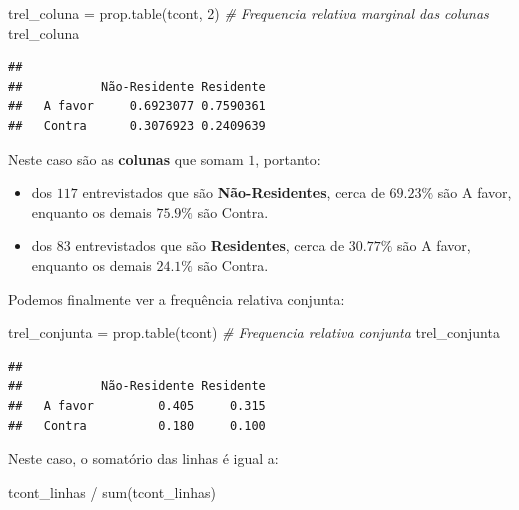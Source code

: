\documentclass[
]{book}
\newenvironment{Shaded}{\begin{snugshade}}{\end{snugshade}}
\newcommand{\CommentTok}[1]{\textcolor[rgb]{0.56,0.35,0.01}{\textit{#1}}}
\newcommand{\DecValTok}[1]{\textcolor[rgb]{0.00,0.00,0.81}{#1}}
\newcommand{\FunctionTok}[1]{\textcolor[rgb]{0.00,0.00,0.00}{#1}}
\newcommand{\NormalTok}[1]{#1}
\newcommand{\OtherTok}[1]{\textcolor[rgb]{0.56,0.35,0.01}{#1}}
\newcommand{\SpecialCharTok}[1]{\textcolor[rgb]{0.00,0.00,0.00}{#1}}
\begin{document}
\begin{Shaded}
\begin{Highlighting}[]
\NormalTok{trel\_coluna }\OtherTok{=} \FunctionTok{prop.table}\NormalTok{(tcont, }\DecValTok{2}\NormalTok{) }\CommentTok{\# Frequencia relativa marginal das colunas}
\NormalTok{trel\_coluna}
\end{Highlighting}
\end{Shaded}

\begin{verbatim}
##          
##           Não-Residente Residente
##   A favor     0.6923077 0.7590361
##   Contra      0.3076923 0.2409639
\end{verbatim}

Neste caso são as \textbf{colunas} que somam \(1\), portanto:

\begin{itemize}
\item
  dos \(117\) entrevistados que são \textbf{Não-Residentes}, cerca de \(69.23\%\) são A favor, enquanto os demais \(75.9\%\) são Contra.
\item
  dos \(83\) entrevistados que são \textbf{Residentes}, cerca de \(30.77\%\) são A favor, enquanto os demais \(24.1\%\) são Contra.
\end{itemize}

Podemos finalmente ver a frequência relativa conjunta:

\begin{Shaded}
\begin{Highlighting}[]
\NormalTok{trel\_conjunta }\OtherTok{=} \FunctionTok{prop.table}\NormalTok{(tcont) }\CommentTok{\# Frequencia relativa conjunta}
\NormalTok{trel\_conjunta}
\end{Highlighting}
\end{Shaded}

\begin{verbatim}
##          
##           Não-Residente Residente
##   A favor         0.405     0.315
##   Contra          0.180     0.100
\end{verbatim}

Neste caso, o somatório das linhas é igual a:

\begin{Shaded}
\begin{Highlighting}[]
\NormalTok{tcont\_linhas }\SpecialCharTok{/} \FunctionTok{sum}\NormalTok{(tcont\_linhas)}
\end{Highlighting}
\end{Shaded}
\end{document}
